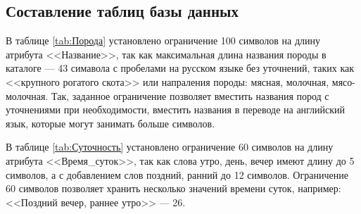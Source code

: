\subsection{Составление таблиц базы данных}

\begin{table}[H]
\centering
\caption{Порода (Breed)}
\label{tab:Порода}
\end{table}

В таблице  \ref{tab:Порода} установлено ограничение 100 символов на длину атрибута <<Название>>, так как максимальная длина названия породы в каталоге \cite{poroda} --- 43 симавола с пробелами на русском языке без уточнений, таких как <<крупного рогатого скота>> или напраления породы: мясная, молочная, мясо-молочная. Так, заданное ограничение позволяет вместить названия пород с уточнениями при необходимости, вместить названия в переводе на английский язык, которые могут занимать больше символов.

\begin{table}[H]
\centering
\caption{Суточность (Day\_times)}
\label{tab:Суточность}
\end{table}

В таблице \ref{tab:Суточность} установлено ограничение 60 символов на длину атрибута <<Время\_суток>>, так как слова утро, день, вечер имеют длину до 5 символов, а с добавлением слов поздний, ранний до 12 символов. Ограничение 60 символов позволяет хранить несколько значений времени суток, например: <<Поздний вечер, раннее утро>> --- 26.

